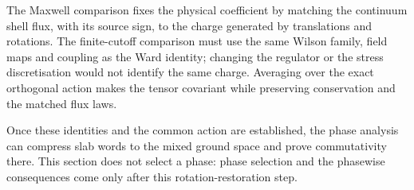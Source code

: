 The Maxwell comparison fixes the physical coefficient by matching the continuum shell flux, with its source sign, to the charge generated by translations and rotations. The finite-cutoff comparison must use the same Wilson family, field maps and coupling as the Ward identity; changing the regulator or the stress discretisation would not identify the same charge. Averaging over the exact orthogonal action makes the tensor covariant while preserving conservation and the matched flux laws.


Once these identities and the common action are established, the phase analysis can compress slab words to the mixed ground space and prove commutativity there. This section does not select a phase: phase selection and the phasewise consequences come only after this rotation-restoration step.
